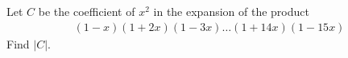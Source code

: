 Let $C$ be the coefficient of $x^{2}$ in the expansion of the product
\begin{align*}
(1-x)(1+2x)(1-3x) \ldots (1+14x)(1-15x)
\end{align*}
Find $|C|$.